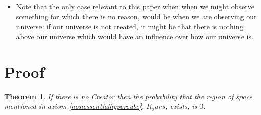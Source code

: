 \documentclass[a4paper
,draft
]{article}
\newtheorem{theorem}{Theorem}[section]
\begin{document}
\begin{enumerate}
\begin{itemize}
    \item Note that the only case relevant to this paper when when we might observe something for which there is no reason, would be when we are observing our universe: if our universe is not created, it might be that there is nothing above our universe which would have an influence over how our universe is.
  \end{itemize}
\end {enumerate}

\section{Proof}

\begin{theorem}
  If there is no Creator then the probability that the region of space mentioned in axiom \ref{nonessentialhypercube}, $R_ours$, exists, is $0$.
\end{theorem}
\end{document}
